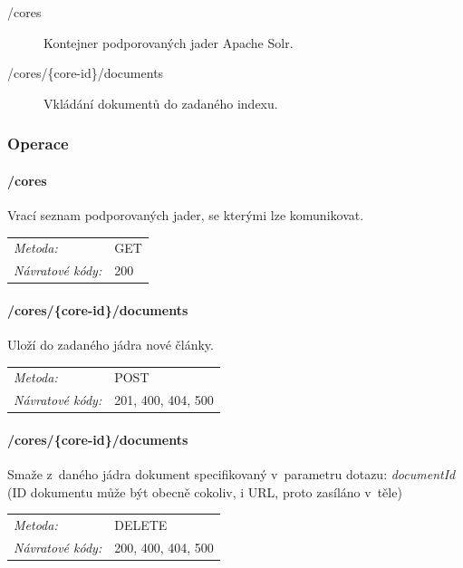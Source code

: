 \documentclass[thesis=M,czech]{FITthesis}[2014/05/07]
\begin{document}
\begin{description}
	\item[/cores] Kontejner podporovaných jader Apache Solr.
	\item[/cores/\{core-id\}/documents] Vkládání dokumentů do zadaného indexu.
\end{description}

\subsubsection{Operace}

\paragraph*{/cores}

Vrací seznam podporovaných jader, se kterými lze komunikovat.

\begin{center}
 	\begin{tabular}{lp{10cm}}
 		\textit{Metoda:}		& GET			\tabularnewline 
 		\textit{Návratové kódy:}		& 200			\tabularnewline 		
 	\end{tabular}
\end{center} 	

\paragraph*{/cores/\{core-id\}/documents}

Uloží do zadaného jádra nové články. 

\begin{center}
 	\begin{tabular}{lp{10cm}}
 		\textit{Metoda:}		& POST			\tabularnewline 
 		\textit{Návratové kódy:}		& 201, 400, 404, 500			\tabularnewline 		
 	\end{tabular}
\end{center} 	

\paragraph*{/cores/\{core-id\}/documents}

Smaže z~daného jádra dokument specifikovaný v~parametru dotazu: \emph{documentId} (ID dokumentu může být obecně cokoliv, i URL, proto zasíláno v~těle)

\begin{center}
 	\begin{tabular}{lp{10cm}}
 		\textit{Metoda:}		& DELETE			\tabularnewline 
 		\textit{Návratové kódy:}		& 200, 400, 404, 500			\tabularnewline 		
 	\end{tabular}
\end{center} 	
\end{document}
